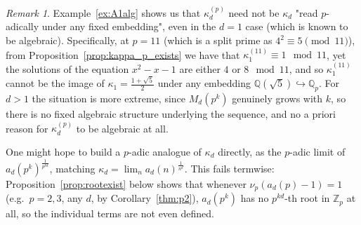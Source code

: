\documentclass{article}
\theoremstyle{plain}
\theoremstyle{definition}
\theoremstyle{remark}
\newtheorem{remark}[theorem]{Remark}
\newcommand{\Q}{\mathbb{Q}}
\newcommand{\Zp}{\mathbb{Z}_p}
\newcommand{\Qp}{\mathbb{Q}_p}
\begin{document}
\begin{remark}
    Example~\ref{ex:A1alg} shows us that $\kappa_d^{(p)}$ need not be  $\kappa_d$ "read $p$-adically under any fixed embedding", even in the $d=1$ case (which is known to be algebraic). Specifically, at $p=11$ (which is a split prime as $4^2\equiv5\pmod{11}$), from Proposition~\ref{prop:kappa_p_exists} we have that $\kappa_1^{(11)} \equiv 1 \mod11$, yet the solutions of the equation $x^2-x-1$ are either $4$ or $8 \mod 11$, and so $\kappa_1^{(11)}$ cannot be the image of $\kappa_1=\frac{1+\sqrt{5}}{2}$ under any embedding $\Q(\sqrt{5}) \hookrightarrow \Qp$. For $d>1$ the situation is more extreme, since $M_d(p^k)$ genuinely grows with $k$, so there is no fixed algebraic structure underlying the sequence, and no a priori reason for $\kappa_d^{(p)}$ to be algebraic at all.
\end{remark}


One might hope to build a $p$-adic analogue of $\kappa_d$ directly, as the $p$-adic limit of $a_d(p^k)^{\frac{1}{p^{kd}}}$, matching $\kappa_d=\lim_na_d(n)^{\frac{1}{n^d}}$. This fails termwise: Proposition~\ref{prop:rootexist} below shows that whenever $\nu_p(a_d(p)-1)=1$ (e.g.\ $p=2,3$, any $d$, by Corollary~\ref{thm:p2}), $a_d(p^k)$ has no $p^{kd}$-th root in $\Zp$ at all, so the individual terms are not even defined.
\end{document}
